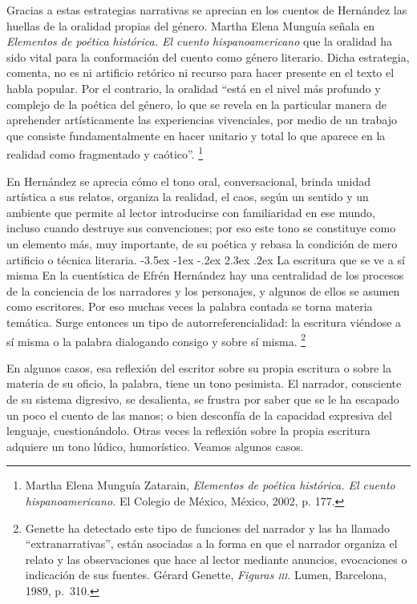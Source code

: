 \documentclass[14pt,twoside,final]{extbook} %
\makeatletter
\let\oldfootnote\footnote
\renewcommand\footnote[1]{%
\oldfootnote{\hspace{1mm}#1}}
\renewcommand\section{\@startsection {section}{1}{\z@}%
                                     {-3.5ex \@plus -1ex \@minus -.2ex}%
                                     {2.3ex \@plus .2ex}%
                                     {\normalfont\large\bfseries\sc}}
\makeatother
\begin{document}
Gracias a estas estrategias narrativas se aprecian en los cuentos de Hernández las huellas de la oralidad propias del género. Martha Elena Munguía señala en \emph{Elementos de poética histórica. El cuento hispanoamericano} que la oralidad ha sido vital para la conformación del cuento como género literario. Dicha estrategia, comenta, no es ni artificio retórico ni recurso para hacer presente en el texto el habla popular. Por el contrario, la oralidad ``está en el nivel más profundo y complejo de la poética del género, lo que se revela en la particular manera de aprehender artísticamente las experiencias vivenciales, por medio de un trabajo que consiste fundamentalmente en hacer unitario y total lo que aparece en la realidad como fragmentado y caótico''.\footnote{Martha Elena Munguía Zatarain, \emph{Elementos de poética histórica. El cuento hispanoamericano.} El Colegio de México, México, 2002, p. 177.}

En Hernández se aprecia cómo el tono oral, conversacional, brinda unidad artística a sus relatos, organiza la realidad, el caos, según un sentido y un ambiente que permite al lector introducirse con familiaridad en ese mundo, incluso cuando destruye sus convenciones; por eso este tono se constituye como un elemento más, muy importante, de su poética y rebasa la condición de mero artificio o técnica literaria.
\section{La escritura que se ve a sí misma}\label{sec:la-escritura-que-se-ve-a-si-misma}
En la cuentística de Efrén Hernández hay una centralidad de los procesos de la conciencia de los narradores y los personajes, y algunos de ellos se asumen como escritores. Por eso muchas veces la palabra contada se torna materia temática. Surge entonces un tipo de autorreferencialidad: la escritura viéndose a sí misma o la palabra dialogando consigo y sobre sí misma.\footnote{Genette ha detectado este tipo de funciones del narrador y las ha llamado ``extranarrativas'', están asociadas a la forma en que el narrador organiza el relato y las observaciones que hace al lector mediante anuncios, evocaciones o indicación de sus fuentes. Gérard Genette, \emph{Figuras \textsc{iii}.} Lumen, Barcelona, 1989, p.~310.}

En algunos casos, esa reflexión del escritor sobre su propia escritura o sobre la materia de su oficio, la palabra, tiene un tono pesimista. El narrador, consciente de su sistema digresivo, se desalienta, se frustra por saber que se le ha escapado un poco el cuento de las manos; o bien desconfía de la capacidad expresiva del lenguaje, cuestionándolo. Otras veces la reflexión sobre la propia escritura adquiere un tono lúdico, humorístico. Veamos algunos casos.
\end{document}
